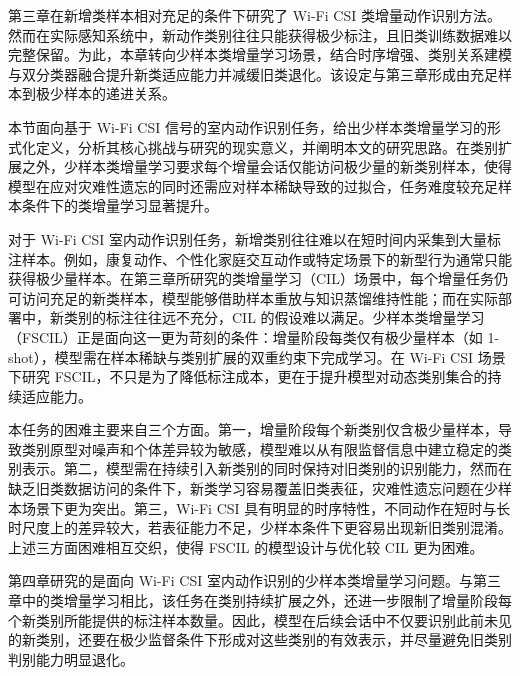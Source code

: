 

第三章在新增类样本相对充足的条件下研究了 Wi-Fi CSI 类增量动作识别方法。然而在实际感知系统中，新动作类别往往只能获得极少标注，且旧类训练数据难以完整保留。为此，本章转向少样本类增量学习场景，结合时序增强、类别关系建模与双分类器融合提升新类适应能力并减缓旧类退化。该设定与第三章形成由充足样本到极少样本的递进关系。


本节面向基于 Wi-Fi CSI 信号的室内动作识别任务，给出少样本类增量学习的形式化定义，分析其核心挑战与研究的现实意义，并阐明本文的研究思路。在类别扩展之外，少样本类增量学习要求每个增量会话仅能访问极少量的新类别样本，使得模型在应对灾难性遗忘的同时还需应对样本稀缺导致的过拟合，任务难度较充足样本条件下的类增量学习显著提升。

对于 Wi-Fi CSI 室内动作识别任务，新增类别往往难以在短时间内采集到大量标注样本。例如，康复动作、个性化家庭交互动作或特定场景下的新型行为通常只能获得极少量样本。在第三章所研究的类增量学习（CIL）场景中，每个增量任务仍可访问充足的新类样本，模型能够借助样本重放与知识蒸馏维持性能；而在实际部署中，新类别的标注往往远不充分，CIL 的假设难以满足。少样本类增量学习（FSCIL）正是面向这一更为苛刻的条件：增量阶段每类仅有极少量样本（如 1-shot），模型需在样本稀缺与类别扩展的双重约束下完成学习。在 Wi-Fi CSI 场景下研究 FSCIL，不只是为了降低标注成本，更在于提升模型对动态类别集合的持续适应能力。

本任务的困难主要来自三个方面。第一，增量阶段每个新类别仅含极少量样本，导致类别原型对噪声和个体差异较为敏感，模型难以从有限监督信息中建立稳定的类别表示。第二，模型需在持续引入新类别的同时保持对旧类别的识别能力，然而在缺乏旧类数据访问的条件下，新类学习容易覆盖旧类表征，灾难性遗忘问题在少样本场景下更为突出。第三，Wi-Fi CSI 具有明显的时序特性，不同动作在短时与长时尺度上的差异较大，若表征能力不足，少样本条件下更容易出现新旧类别混淆。上述三方面困难相互交织，使得 FSCIL 的模型设计与优化较 CIL 更为困难。


第四章研究的是面向 Wi-Fi CSI 室内动作识别的少样本类增量学习问题。与第三章中的类增量学习相比，该任务在类别持续扩展之外，还进一步限制了增量阶段每个新类别所能提供的标注样本数量。因此，模型在后续会话中不仅要识别此前未见的新类别，还要在极少监督条件下形成对这些类别的有效表示，并尽量避免旧类别判别能力明显退化。

